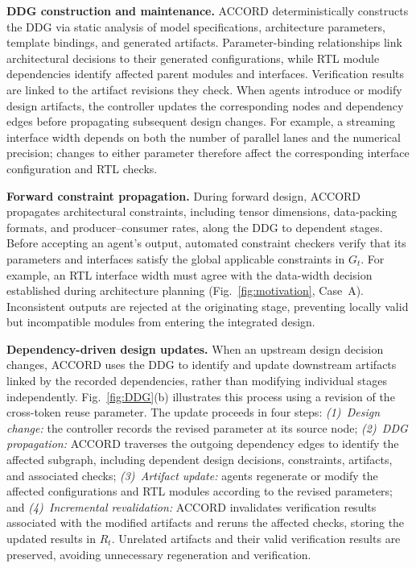 \documentclass[9pt,conference]{IEEEtran}
\begin{document}
\textbf{DDG construction and maintenance.}
ACCORD deterministically constructs the DDG via static analysis of model specifications,
architecture parameters, template bindings, and
generated artifacts. Parameter-binding relationships
link architectural decisions to their generated
configurations, while RTL module dependencies
identify affected parent modules and interfaces.
Verification results are linked to the artifact
revisions they check. When agents introduce or
modify design artifacts, the controller updates
the corresponding nodes and dependency edges
before propagating subsequent design changes. For example, a streaming interface width depends
on both the number of parallel lanes and the
numerical precision; changes to either parameter
therefore affect the corresponding interface
configuration and RTL checks.

\textbf{Forward constraint propagation.}
During forward design, ACCORD propagates architectural constraints, including tensor dimensions, data-packing formats, and producer--consumer rates, along the DDG to dependent stages. Before accepting an agent's output, automated constraint checkers verify that its parameters and interfaces satisfy the global applicable constraints in $G_t$. For example, an RTL interface width must agree with the data-width decision established during architecture planning (Fig.~\ref{fig:motivation}, Case~A). Inconsistent outputs are rejected at the originating stage, preventing locally valid but incompatible modules from entering the integrated design.

\textbf{Dependency-driven design updates.}
When an upstream design decision changes, ACCORD uses the DDG to identify and update downstream artifacts linked by the recorded dependencies, rather than modifying individual stages independently. Fig.~\ref{fig:DDG}(b) illustrates this process using a revision of the cross-token reuse parameter. The update proceeds in four steps:
\emph{(1)~Design change:} the controller records the revised parameter at its source node;
\emph{(2)~DDG propagation:} ACCORD traverses the outgoing dependency edges to identify the affected subgraph, including dependent design decisions, constraints, artifacts, and associated checks;
\emph{(3)~Artifact update:} agents regenerate or modify the affected configurations and RTL modules according to the revised parameters; and
\emph{(4)~Incremental revalidation:} ACCORD invalidates verification results associated with the modified artifacts and reruns the affected checks, storing the updated results in $R_t$.
Unrelated artifacts and their valid verification results are preserved, avoiding unnecessary regeneration and verification.
\end{document}
